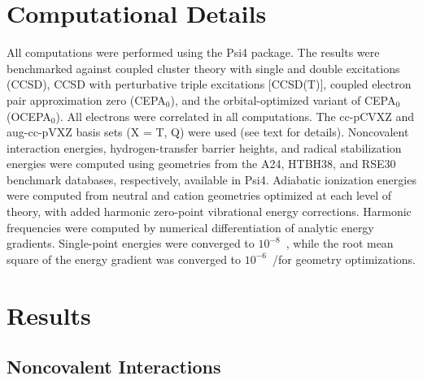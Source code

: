 \section{Computational Details}


All computations were performed using the Psi4
package.\cite{Turney:2012p556}
The results were benchmarked against coupled cluster theory with single and
double excitations (CCSD)\cite{Crawford:2000p33,Bartlett:2007p291,Shavitt:2009},
CCSD with perturbative triple excitations
[CCSD(T)],\cite{Raghavachari:1989p479,Stanton:1997p130} coupled electron pair
approximation zero (CEPA$_0$),\cite{Meyer:1973p1017,Koch:1981p387} and the
orbital-optimized variant of CEPA$_0$ (OCEPA$_0$)\cite{Bozkaya:2013p054104}.
All electrons were correlated in all computations.
The cc-pCVXZ\cite{Dunning:1989p1007,Woon:1995p4572} and
aug-cc-pVXZ\cite{Kendall:1992p6796} basis sets (X = T, Q) were used (see text
for details).
Noncovalent interaction energies, hydrogen-transfer barrier heights, and radical
stabilization energies were computed using geometries from the
A24\cite{Rezac:2013p2151}, HTBH38\cite{Zhao:2005p43}, and
RSE30\cite{Soydas:2013p1452} benchmark databases, respectively, available in
Psi4.
Adiabatic ionization energies were computed from neutral and cation geometries
optimized at each level of theory, with added harmonic zero-point vibrational
energy corrections.
Harmonic frequencies were computed by numerical differentiation of analytic
energy gradients.
Single-point energies were converged to $10^{-8}$~\hartree, while the root mean
square of the energy gradient was converged to $10^{-6}$~\hartree/\bohr for
geometry optimizations. 


\section{Results}

\subsection{Noncovalent Interactions}

